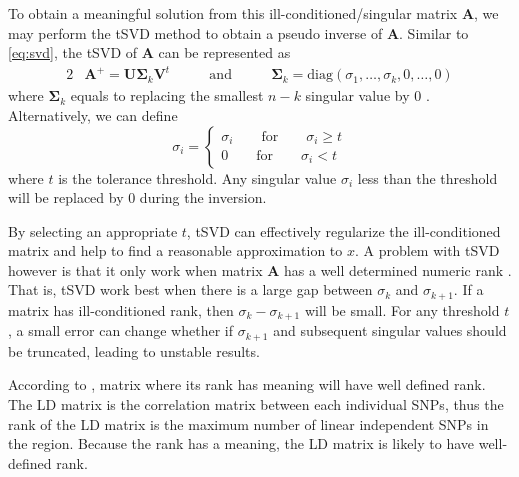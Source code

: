 			To obtain a meaningful solution from this ill-conditioned/singular matrix $\boldsymbol{A}$, we may perform the \gls{tSVD} method to obtain a pseudo inverse of $\boldsymbol{A}$.
			Similar to \cref{eq:svd}, the \gls{tSVD} of $\boldsymbol{A}$ can be represented as 
			\begin{alignat}{2}
				&\boldsymbol{A}^+ = \boldsymbol{U\Sigma}_k\boldsymbol{V}^t  &\qquad\text{and}\qquad  &\boldsymbol{\Sigma}_k=\mathrm{diag}(\sigma_1,\dots,\sigma_k,0,\dots,0)
				\label{eq:tsvd}				
			\end{alignat}
			where $\boldsymbol{\Sigma}_k$ equals to replacing the smallest $n-k$ singular value by 0 \citep{Hansen1987}. 
			Alternatively, we can define
			\begin{equation}
			\sigma_i=\begin{cases}
			\sigma_i\qquad\text{for}\qquad\sigma_i\ge t\\
			0\qquad\text{for}\qquad\sigma_i<t
			\end{cases}
			\end{equation}
			where $t$ is the tolerance threshold. 
			Any singular value $\sigma_i$ less than the threshold will be replaced by 0 during the inversion.
			
			By selecting an appropriate $t$, \gls{tSVD} can effectively regularize the ill-conditioned matrix and help to find a reasonable approximation to $x$. 
			A problem with \gls{tSVD} however is that it only work when matrix $\boldsymbol{A}$ has a well determined numeric rank \citep{Hansen1987}.
			That is, \gls{tSVD} work best when there is a large gap between $\sigma_k$ and $\sigma_{k+1}$.
			If a matrix has ill-conditioned rank, then $\sigma_k-\sigma_{k+1}$ will be small.
			For any threshold $t$, a small error can change whether if $\sigma_{k+1}$ and subsequent singular values should be truncated, leading to unstable results. 
			
			According to \citet{Hansen1987}, matrix where its rank has meaning will have well defined rank. 
			The \gls{LD} matrix is the correlation matrix between each individual \glspl{SNP}, thus the rank of the \gls{LD} matrix is the maximum number of linear independent \glspl{SNP} in the region.
			Because the rank has a meaning, the \gls{LD} matrix is likely to have well-defined rank.
			 
